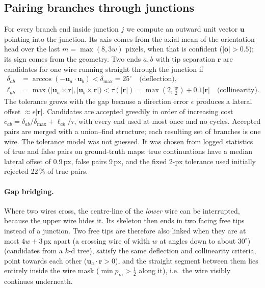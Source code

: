 \documentclass[11pt,a4paper]{article}
\begin{document}
\subsection{Pairing branches through junctions}
For every branch end inside junction $j$ we compute an outward unit vector $\mathbf u$ pointing into the junction. Its axis comes from the axial mean of the orientation head over the last $m=\max(8,3w)$ pixels, when that is confident ($|\bar{\mathbf o}|>0.5$); its sign comes from the geometry. Two ends $a,b$ with tip separation $\mathbf r$ are candidates for one wire running straight through the junction if
\begin{align}
\delta_{ab}&=\arccos(-\mathbf u_a\cdot\mathbf u_b)<\delta_{\max}=25^\circ \quad\text{(deflection)},\\
\ell_{ab}&=\max\bigl(|\mathbf u_a\times\mathbf r|,|\mathbf u_b\times\mathbf r|\bigr)<\tau(|\mathbf r|)=\max(2,\tfrac w2)+0.1|\mathbf r| \quad\text{(collinearity)}.
\end{align}
The tolerance grows with the gap because a direction error $\epsilon$ produces a lateral offset $\approx\epsilon|\mathbf r|$. Candidates are accepted greedily in order of increasing cost $c_{ab}=\delta_{ab}/\delta_{\max}+\ell_{ab}/\tau$, with every end used at most once and no cycles. Accepted pairs are merged with a union--find structure; each resulting set of branches is one wire. The tolerance model was not guessed. It was chosen from logged statistics of true and false pairs on ground-truth maps: true continuations have a median lateral offset of 0.9\,px, false pairs 9\,px, and the fixed 2-px tolerance used initially rejected 22\,\% of true pairs.

\paragraph{Gap bridging.} Where two wires cross, the centre-line of the \emph{lower} wire can be interrupted, because the upper wire hides it. Its skeleton then ends in two facing free tips instead of a junction. Two free tips are therefore also linked when they are at most $4w+3$\,px apart (a crossing wire of width $w$ at angles down to about $30^\circ$) (candidates from a $k$-d tree), satisfy the same deflection and collinearity criteria, point towards each other ($\mathbf u_a\cdot\mathbf r>0$), and the straight segment between them lies entirely inside the wire mask ($\min p_m>\tfrac12$ along it), i.e.\ the wire visibly continues underneath.
\end{document}
